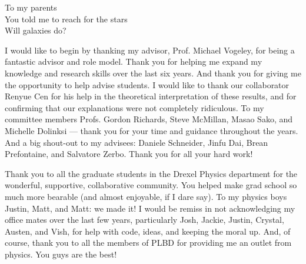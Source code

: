 \begin{preamble}

\iffinal{}{\newpage}


\begin{DUTdedications}
\begin{center}
To my parents\\
You told me to reach for the stars\\
Will galaxies do?
\end{center}
\end{DUTdedications}

\iffinal{}{\newpage}


\begin{acknowledgments}

I would like to begin by thanking my advisor, Prof. Michael Vogeley, for being a 
fantastic advisor and role model.  Thank you for helping me expand my knowledge 
and research skills over the last six years.  And thank you for giving me the 
opportunity to help advise students.  I would like to thank our collaborator 
Renyue Cen for his help in the theoretical interpretation of these results, and 
for confirming that our explanations were not completely ridiculous.  To my 
committee members Profs. Gordon Richards, Steve McMillan, Masao Sako, and 
Michelle Dolinksi --- thank you for your time and guidance throughout the years.  
And a big shout-out to my advisees: Daniele Schneider, Jinfu Dai, Brean 
Prefontaine, and Salvatore Zerbo.  Thank you for all your hard work!

Thank you to all the graduate students in the Drexel Physics department for the 
wonderful, supportive, collaborative community.  You helped make grad school so 
much more bearable (and almost enjoyable, if I dare say).  To my physics boys 
Justin, Matt, and Matt: we made it!  I would be remiss in not acknowledging my 
office mates over the last few years, particularly Josh, Jackie, Justin, 
Crystal, Austen, and Vish, for help with code, ideas, and keeping the moral up.  
And, of course, thank you to all the members of PLBD for providing me an outlet 
from physics.  You guys are the best!


\end{acknowledgments}
\end{preamble}
